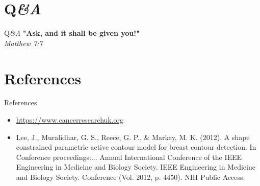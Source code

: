 \documentclass[10pt]{beamer}
\begin{document}
\section{Q\em\&A}
\begin{frame}{Q\em\&A}{} 
\textbf{"Ask, and it shall be given you!"}\centering\\
\em Matthew 7:7
\end{frame}
\section{References}
\begin{frame}{References}{} 
\begin{itemize}
	\item\href{https://www.cancerresearchuk.org/health-professional/cancer-statistics/statistics-by-cancer-type/breast-cancer/mortality}{https://www.cancerresearchuk.org}
	\item Lee, J., Muralidhar, G. S., Reece, G. P., \& Markey, M. K. (2012). A shape constrained parametric active contour model for breast contour detection. In Conference proceedings:... Annual International Conference of the IEEE Engineering in Medicine and Biology Society. IEEE Engineering in Medicine and Biology Society. Conference (Vol. 2012, p. 4450). NIH Public Access.
\end{itemize}
\end{frame}


%
{\1
\begin{frame}

\end{frame}}
\end{document}
